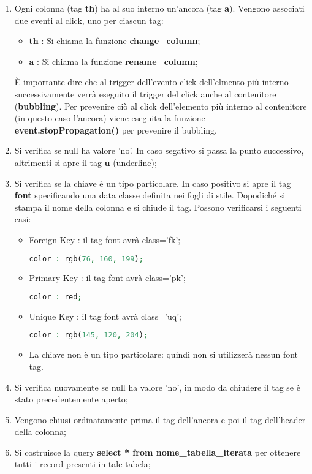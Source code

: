 \begin{enumerate}
\item Ogni colonna (tag \textbf{th}) ha al suo interno un'ancora (tag \textbf{a}). Vengono associati due eventi al click, uno per ciascun tag:
\begin{itemize}
\item \textbf{th} : Si chiama la funzione \textbf{change\_column};
\item \textbf{a} : Si chiama la funzione \textbf{rename\_column};
\end{itemize}
È importante dire che al trigger dell'evento click dell'elmento più interno successivamente verrà eseguito il trigger del click anche al contenitore (\textbf{bubbling}). Per prevenire ciò al click dell'elemento più interno al contenitore (in questo caso l'ancora) viene eseguita la funzione \textbf{event.stopPropagation()} per prevenire il bubbling.
\item Si verifica se null ha valore 'no'. In caso segativo si passa la punto successivo, altrimenti si apre il tag \textbf{u} (underline);
\item Si verifica se la chiave è un tipo particolare. In caso positivo si apre il tag \textbf{font} specificando una data classe definita nei fogli di stile. Dopodiché si stampa il nome della colonna e si chiude il tag. Possono verificarsi i seguenti casi:
\begin{itemize}
\item Foreign Key : il tag font avrà class='fk'; 
\begin{lstlisting}[language=PHP]
color : rgb(76, 160, 199);
\end{lstlisting}
\item Primary Key : il tag font avrà class='pk'; 
\begin{lstlisting}[language=PHP]
color : red;
\end{lstlisting}
\item Unique Key : il tag font avrà class='uq'; 
\begin{lstlisting}[language=PHP]
color : rgb(145, 120, 204);
\end{lstlisting}
\item La chiave non è un tipo particolare: quindi  non si utilizzerà nessun font tag.
\end{itemize}
\item Si verifica nuovamente se null ha valore 'no', in modo da chiudere il tag se è stato precedentemente aperto;
\item Vengono chiusi ordinatamente prima il tag dell'ancora e poi il tag dell'header della colonna;
\item Si costruisce la query \textbf{select * from nome\_tabella\_iterata} per ottenere tutti i record presenti in tale tabela;

\end{enumerate}

